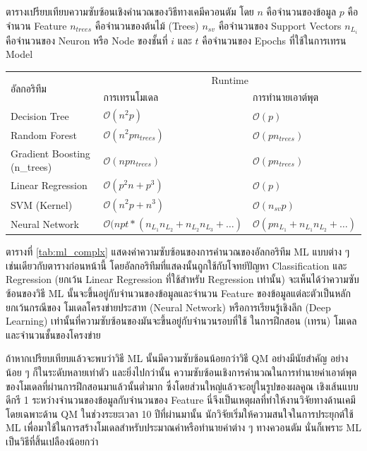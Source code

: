 \begin{adjustwidth}{-2.5 cm}{-2.5 cm}
    \centering
    \begin{threeparttable}[H]
    \caption{ตารางเปรียบเทียบความซับซ้อนเชิงคำนวณของวิธีทางเคมีควอนตัม\autocite{zotero-328} โดย $n$ คือจำนวนของข้อมูล $p$ 
    คือจำนวน Feature $n_{trees}$ คือจำนวนของต้นไม้ (Trees) $n_{sv}$ คือจำนวนของ Support Vectors $n_{L_{i}}$ 
    คือจำนวนของ Neuron หรือ Node ของชั้นที่ $i$ และ $t$ คือจำนวนของ Epochs ที่ใช้ในการเทรน Model}
    \label{tab:ml_complx}
    \small
    \begin{tabular}{lll}\toprule
    \multirow{2}{*}{อัลกอริทึม} &\multicolumn{2}{c}{Runtime} \\\cmidrule{2-3}
    &การเทรนโมเดล &การทำนายเอาต์พุต\\\midrule
    Decision Tree &$\mathcal{O}(n^{2}p)$ &$\mathcal{O}(p)$ \\
    Random Forest &$\mathcal{O}(n^{2}pn_{trees})$ &$\mathcal{O}(pn_{trees})$ \\
    Gradient Boosting (n\_{trees}) &$\mathcal{O}(npn_{trees})$ &$\mathcal{O}(pn_{trees})$ \\
    Linear Regression &$\mathcal{O}(p^{2}n+p^{3})$ &$\mathcal{O}(p)$ \\
    SVM (Kernel) &$\mathcal{O}(n^{2}p+n^{3})$ &$\mathcal{O}(n_{sv}p)$ \\
    Neural Network &$\mathcal{O}(npt*(n_{L_{1}}n_{L_{2}}+ n_{L_{2}}n_{L_{3}} + \dots)$ &$\mathcal{O}(pn_{L_{1}} 
    + n_{L_{1}}n_{L_{2}}+ \dots)$ \\
    \bottomrule
    \end{tabular}
\end{threeparttable}
\end{adjustwidth}

ตารางที่ \ref{tab:ml_complx} แสดงค่าความซับซ้อนของการคำนวณของอัลกอริทึม ML แบบต่าง ๆ เช่นเดียวกับตารางก่อนหน้านี้ 
โดยอัลกอริทึมที่แสดงนั้นถูกใช้กับโจทย์ปัญหา Classification และ Regression (ยกเว้น Linear Regression ที่ใช้สำหรับ Regression 
เท่านั้น) จะเห็นได้ว่าความซับซ้อนของวิธี ML นั้นจะขึ้นอยู่กับจำนวนของข้อมูลและจำนวน Feature ของข้อมูลแต่ละตัวเป็นหลัก ยกเว้นกรณีของ
โมเดลโครงข่ายประสาท (Neural Network) หรือการเรียนรู้เชิงลึก (Deep Learning) เท่านั้นที่ความซับซ้อนของมันจะขึ้นอยู่กับจำนวนรอบที่ใช้%
ในการฝึกสอน (เทรน) โมเดลและจำนวนชั้นของโครงข่าย

ถ้าหากเปรียบเทียบแล้วจะพบว่าวิธี ML นั้นมีความซับซ้อนน้อยกว่าวิธี QM อย่างมีนัยสำคัญ อย่างน้อย ๆ ก็ในระดับหลายเท่าตัว และยิ่งไปกว่านั้น
ความซับซ้อนเชิงการคำนวณในการทำนายค่าเอาต์พุตของโมเดลที่ผ่านการฝึกสอนมาแล้วนั้นต่ำมาก ซึ่งโดยส่วนใหญ่แล้วจะอยู่ในรูปของผลคูณ%
เชิงเส้นแบบดีกรี 1 ระหว่างจำนวนของข้อมูลกับจำนวนของ Feature นี่จึงเป็นเหตุผลที่ทำให้งานวิจัยทางด้านเคมี โดยเฉพาะด้าน QM ในช่วงระยะเวลา
10 ปีที่ผ่านมานั้น นักวิจัยเริ่มให้ความสนใจในการประยุกต์ใช้ ML เพื่อมาใช้ในการสร้างโมเดลสำหรับประมาณค่าหรือทำนายค่าต่าง ๆ ทางควอนตัม 
นั่นก็เพราะ ML เป็นวิธีที่สิ้นเปลืองน้อยกว่า

